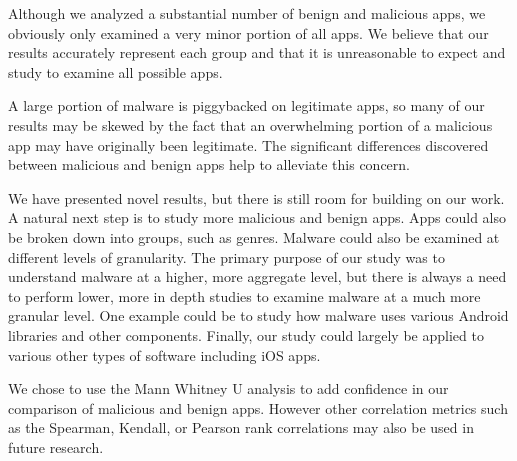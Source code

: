 \documentclass{sig-alternate}
\newcommand{\todo}[1]{\textcolor{cyan}{\textbf{[#1]}}}
\begin{document}
Although we analyzed a substantial number of benign and malicious apps, we obviously only examined a very minor portion of all apps. We believe that our results accurately represent each group and that it is unreasonable to expect and study to examine all possible apps.

A large portion of malware is piggybacked on legitimate apps, so many of our results may be skewed by the fact that an overwhelming portion of a malicious app may have originally been legitimate. The significant differences discovered between malicious and benign apps help to alleviate this concern.






We have presented novel results, but there is still room for building on our work. A natural next step is to study more malicious and benign apps. Apps could also be broken down into groups, such as genres. Malware could also be examined at different levels of granularity. The primary purpose of our study was to understand malware at a higher, more aggregate level, but there is always a need to perform lower, more in depth studies to examine malware at a much more granular level. One example could be to study how malware uses various Android libraries and other components. Finally, our study could largely be applied to various other types of software including iOS apps.

We chose to use the Mann Whitney U analysis to add confidence in our comparison of malicious and benign apps. However other correlation metrics such as the Spearman, Kendall, or Pearson rank correlations may also be used in future research.
\end{document}
